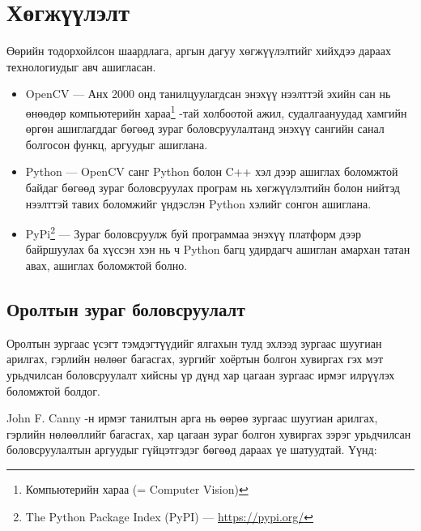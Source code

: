 
\chapter{Хөгжүүлэлт}

Өөрийн тодорхойлсон шаардлага, аргын дагуу хөгжүүлэлтийг хийхдээ дараах технологиудыг авч ашигласан.

\begin{itemize}
	\item OpenCV \cite{opencv} --- Анх 2000 онд танилцуулагдсан энэхүү нээлттэй эхийн сан нь өнөөдөр компьютерийн хараа\footnote{ Компьютерийн хараа (= Computer Vision)} -тай холбоотой ажил, судалгаануудад хамгийн өргөн ашиглагддаг бөгөөд зураг боловсруулалтанд энэхүү сангийн санал болгосон функц, аргуудыг ашиглана.
	\item Python \cite{python} --- OpenCV санг Python болон C++ хэл дээр ашиглах боломжтой байдаг бөгөөд зураг боловсруулах програм нь хөгжүүлэлтийн болон нийтэд нээлттэй тавих боломжийг үндэслэн Python хэлийг сонгон ашиглана.
	\item PyPi\footnote{The Python Package Index (PyPI) --- \url{https://pypi.org/}} --- Зураг боловсруулж буй программаа энэхүү платформ дээр байршуулах ба хүссэн хэн нь ч Python багц удирдагч ашиглан амархан татан авах, ашиглах боломжтой болно.
\end{itemize}

\section{Оролтын зураг боловсруулалт}

Оролтын зургаас үсэгт тэмдэгтүүдийг ялгахын тулд эхлээд зургаас шуугиан арилгах, гэрлийн нөлөөг багасгах, зургийг хоёртын болгон хувиргах гэх мэт урьдчилсан боловсруулалт хийсны үр дүнд хар цагаан зургаас ирмэг илрүүлэх боломжтой болдог.

John F. Canny -н ирмэг танилтын арга нь өөрөө зургаас шуугиан арилгах, гэрлийн нөлөөллийг багасгах, хар цагаан зураг болгон хувиргах зэрэг урьдчилсан боловсруулалтын аргуудыг гүйцэтгэдэг бөгөөд дараах үе шатуудтай. Үүнд:

